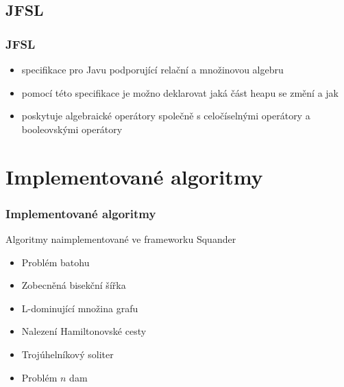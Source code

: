 \documentclass[czech]{beamer}
\begin{document}
\subsection{JFSL}

\begin{frame}
  \frametitle{JFSL}   %
  \begin{itemize}
  \item<1-> specifikace pro Javu podporující relační a množinovou algebru
  \item<2-> pomocí této specifikace je možno deklarovat jaká část heapu se změní
  a jak
  \item<3-> poskytuje algebraické operátory společně s celočíselnými operátory a
  booleovskými operátory
  \end{itemize}
\end{frame}

\section{Implementované algoritmy}

\begin{frame}
  \frametitle{Implementované algoritmy}   
  \begin{block}{Algoritmy naimplementované ve frameworku Squander}
  \begin{itemize}
  \item<1-> Problém batohu
  \item<2-> Zobecněná bisekční šířka
  \item<3-> L-dominující množina grafu
  \item<4-> Nalezení Hamiltonovské cesty
  \item<5-> Trojúhelníkový soliter
  \item<6-> Problém $n$ dam 
  \end{itemize}
  \end{block}
\end{frame}
\end{document}
